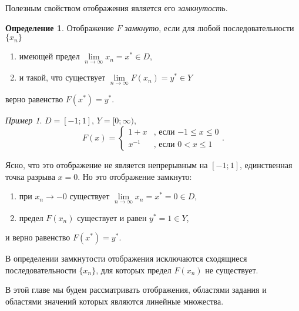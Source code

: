 \documentclass[12pt,a4paper,titlepage,oneside]{book}
\theoremstyle{definition}
\newtheorem*{definition}{Определение}
\theoremstyle{plain}
\theoremstyle{break}
\theoremstyle{remark}
\theoremstyle{remark}
\newtheorem*{example}{Пример}
\theoremstyle{remark}
\theoremstyle{remark}
\theoremstyle{plain}
\theoremstyle{plain}
\begin{document}
Полезным свойством отображения является его \textit{замкнутость}.

\begin{definition} Отображение $F$ \textit{замкнуто}, если для любой последовательности  $\lbrace x_n \rbrace$

\begin{enumerate}

 \item имеющей предел $\lim \limits_{n \to \infty} x_n= x^* \in D$,
 
 \item и такой, что существует $\lim \limits_{n \to \infty} F(x_n)= y^* \in Y$
 
\end{enumerate} 
 
верно равенство $F(x^*)=y^*$.

\end{definition}

\begin{example}
$D=[-1;1]$, $Y=[0;\infty)$,
\begin{equation*}
F(x) = 
\begin{cases}
   1+x &\text{, если $-1\leqslant x \leqslant 0$}\\
   x^{-1} &\text{, если $0< x \leqslant 1$}
\end{cases}
.
\end{equation*}

Ясно, что это отображение не является непрерывным на $[-1;1]$, единственная точка разрыва $x=0$. Но это отображение замкнуто:

\begin{enumerate}

 \item при $x_n \to -0$ существует $\lim \limits_{n \to \infty} x_n= x^*=0 \in D$,
 
 \item предел $F(x_n)$ существует и равен $y^*=1 \in Y$,
 
\end{enumerate}
и верно равенство $F(x^*)=y^*$.

\end{example}

В определении замкнутости отображения исключаются сходящиеся последовательности $\lbrace x_n \rbrace$, для которых предел $F(x_n)$ не существует.

В этой главе мы будем рассматривать отображения, областями задания и областями значений которых являются линейные множества.
\end{document}
